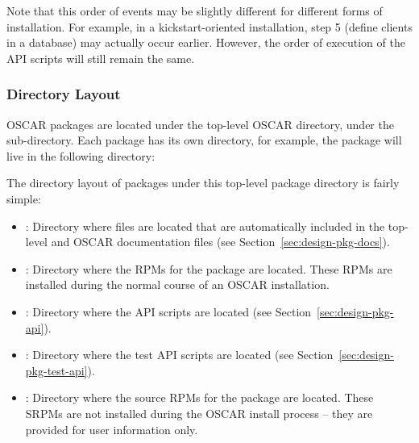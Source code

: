 Note that this order of events may be slightly different for different
forms of installation.  For example, in a kickstart-oriented
installation, step 5 (define clients in a database) may actually occur
earlier.  However, the order of execution of the API scripts will
still remain the same.

\endchange


\subsubsection{Directory Layout}

OSCAR packages are located under the top-level OSCAR directory, under
the  sub-directory.  Each package has its own
directory, for example, the  package will live in the
following directory:

\vspace{10pt}
\centerline{}
\vspace{10pt}

The directory layout of packages under this top-level package
directory is fairly simple:

\begin{itemize}
\item {}: Directory where files are located that are
  automatically included in the top-level  and
   OSCAR documentation files (see
  Section~\ref{sec:design-pkg-docs}).
  
\item {}: Directory where the RPMs for the package are
  located.  These RPMs are installed during the normal course of an
  OSCAR installation.

\item {}: Directory where the API scripts are located
  (see Section~\ref{sec:design-pkg-api}).
  
\item {}: Directory where the test API scripts are located
  (see Section~\ref{sec:design-pkg-test-api}).
  
\item {}: Directory where the source RPMs for the
  package are located.  These SRPMs are not installed during the OSCAR
  install process -- they are provided for user information only.
\end{itemize}


